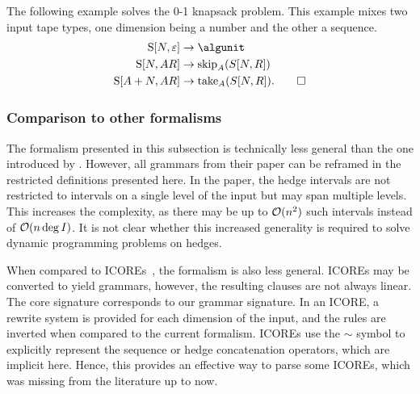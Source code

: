 \begin{example}[0-1 knapsack]
    The following example solves the 0-1 knapsack problem.
    This example mixes two input tape types, one dimension being a number and the other a sequence.
    \begin{align*}
        \gramnt{S}[N, \varepsilon] &\rightarrow \algunit \\
        \gramnt{S}[N, AR] &\rightarrow \algsym{skip}_A(S[N, R]) \\
        \gramnt{S}[A + N, AR] &\rightarrow \algsym{take}_A(S[N, R]). \qedhere
    \end{align*}
\end{example}






\subsubsection{Comparison to other formalisms}

The formalism presented in this subsection is technically less general than the one introduced by \textcite{Berkemer2017AlgebraicDynamicProgramming}.
However, all grammars from their paper can be reframed in the restricted definitions presented here.
In the paper, the hedge intervals are not restricted to intervals on a single level of the input but may span multiple levels.
This increases the complexity, as there may be up to \(\operatorname{\mathcal{O}}(n^2)\) such intervals instead of \(\operatorname{\mathcal{O}}(n\deg I)\).
It is not clear whether this increased generality is required to solve dynamic programming problems on hedges.

When compared to ICOREs~\parencite{Giegerich2014ModelingDynamicProgramming}, the formalism is also less general.
ICOREs may be converted to yield grammars, however, the resulting clauses are not always linear.
The core signature corresponds to our grammar signature.
In an ICORE, a rewrite system is provided for each dimension of the input, and the rules are inverted when compared to the current formalism.
ICOREs use the \(\sim\) symbol to explicitly represent the sequence or hedge concatenation operators, which are implicit here.
Hence, this provides an effective way to parse some ICOREs, which was missing from the literature up to now.

